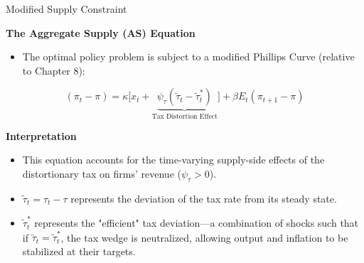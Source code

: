 \documentclass[11pt,aspectratio=169]{beamer}
\begin{document}
\begin{frame}{Modified Supply Constraint}
\small

\textbf{The Aggregate Supply (AS) Equation}
\begin{itemize}
    \item The optimal policy problem is subject to a modified Phillips Curve (relative to Chapter 8):
\end{itemize}

\footnotesize
\begin{equation*}
    (\pi _{t}-\pi )=\kappa \bigg[ x_t + \underbrace{\psi _{\tau }(\tilde{\tau}_{t}-\tilde{\tau}_{t}^{\ast })}_{\text{Tax Distortion Effect}} \bigg] + \beta E_{t}(\pi _{t+1}-\pi )
\end{equation*}

\vspace{0.2cm}
\small
\textbf{Interpretation}
\begin{itemize}
    \item This equation accounts for the time-varying supply-side effects of the distortionary tax on firms' revenue ($\psi _{\tau } > 0$).
    \item $\tilde{\tau}_{t} = \tau _{t}-\tau$ represents the deviation of the tax rate from its steady state.
    \item $\tilde{\tau}_{t}^{\ast }$ represents the "efficient" tax deviation—a combination of shocks such that if $\tilde{\tau}_{t} = \tilde{\tau}_{t}^{\ast }$, the tax wedge is neutralized, allowing output and inflation to be stabilized at their targets.
\end{itemize}
\end{frame}%
\end{document}
